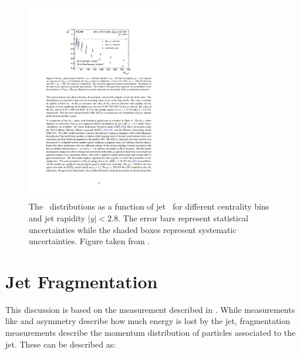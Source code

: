 \begin{figure}[htbp]
\begin{center}
\includegraphics[width=0.55\textwidth]{figures/jetMeasurements/raa_centDep}
\caption{The \RAA\ distributions as a function of jet \pt\ for different centrality bins and jet rapidity $|y| < 2.8$. The error bars represent statistical uncertainties while the shaded boxes represent systematic uncertainties. Figure taken from \cite{2019108}.}
\label{fig:raa_centDep}
\end{center}
\end{figure}














\section{Jet Fragmentation}
\label{sec:jet_ff}
This discussion is based on the measurement described in \cite{PhysRevC.98.024908}. While measurements like \RAA \cite{} and asymmetry \cite{} describe how much energy is lost by the jet, fragmentation measurements describe the momentum distribution of particles associated to the jet. These can be described as:

